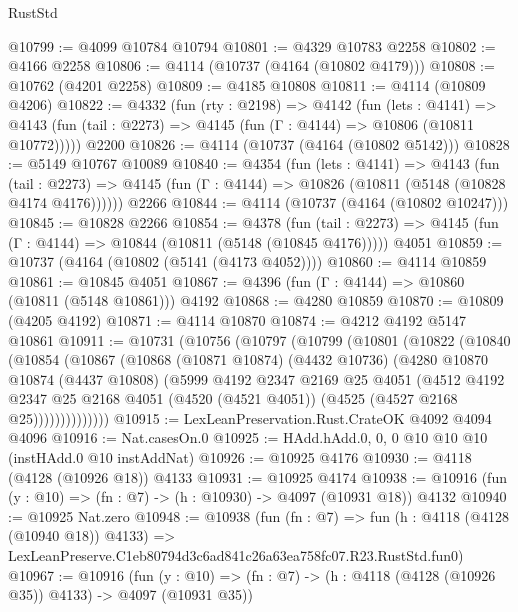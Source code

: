 \begin{lexlean}{RustStd}
\begin{coremodule}
@10799 := @4099 @10784 @10794
@10801 := @4329 @10783 @2258
@10802 := @4166 @2258
@10806 := @4114 (@10737 (@4164 (@10802 @4179)))
@10808 := @10762 (@4201 @2258)
@10809 := @4185 @10808
@10811 := @4114 (@10809 @4206)
@10822 := @4332
    (fun (rty : @2198) =>
    @4142
      (fun (lets : @4141) =>
      @4143 (fun (tail : @2273) => @4145 (fun (Γ : @4144) => @10806 (@10811 @10772)))))
    @2200
@10826 := @4114 (@10737 (@4164 (@10802 @5142)))
@10828 := @5149 @10767 @10089
@10840 := @4354
    (fun (lets : @4141) =>
    @4143
      (fun (tail : @2273) =>
      @4145 (fun (Γ : @4144) => @10826 (@10811 (@5148 (@10828 @4174 @4176))))))
    @2266
@10844 := @4114 (@10737 (@4164 (@10802 @10247)))
@10845 := @10828 @2266
@10854 := @4378
    (fun (tail : @2273) => @4145 (fun (Γ : @4144) => @10844 (@10811 (@5148 (@10845 @4176)))))
    @4051
@10859 := @10737 (@4164 (@10802 (@5141 (@4173 @4052))))
@10860 := @4114 @10859
@10861 := @10845 @4051
@10867 := @4396 (fun (Γ : @4144) => @10860 (@10811 (@5148 @10861))) @4192
@10868 := @4280 @10859
@10870 := @10809 (@4205 @4192)
@10871 := @4114 @10870
@10874 := @4212 @4192 @5147 @10861
@10911 := @10731
    (@10756
      (@10797
        (@10799
          (@10801
            (@10822
              (@10840
                (@10854
                  (@10867
                    (@10868
                      (@10871 @10874)
                      (@4432 @10736)
                      (@4280
                        @10870
                        @10874
                        (@4437 @10808)
                        (@5999
                          @4192
                          @2347
                          @2169
                          @25
                          @4051
                          (@4512
                            @4192
                            @2347
                            @25
                            @2168
                            @4051
                            (@4520 (@4521 @4051))
                            (@4525 (@4527 @2168 @25))))))))))))))
@10915 := LexLeanPreservation.Rust.CrateOK @4092 @4094 @4096
@10916 := Nat.casesOn.{0}
@10925 := HAdd.hAdd.{0, 0, 0} @10 @10 @10 (instHAdd.{0} @10 instAddNat)
@10926 := @10925 @4176
@10930 := @4118 (@4128 (@10926 @18)) @4133
@10931 := @10925 @4174
@10938 := @10916 (fun (y : @10) => (fn : @7) -> (h : @10930) -> @4097 (@10931 @18)) @4132
@10940 := @10925 Nat.zero
@10948 := @10938
    (fun (fn : @7) =>
    fun (h : @4118 (@4128 (@10940 @18)) @4133) =>
    LexLeanPreserve.C1eb80794d3c6ad841c26a63ea758fc07.R23.RustStd.fun0)
@10967 := @10916
    (fun (y : @10) => (fn : @7) -> (h : @4118 (@4128 (@10926 @35)) @4133) -> @4097 (@10931 @35))

\end{coremodule}
\end{lexlean}
